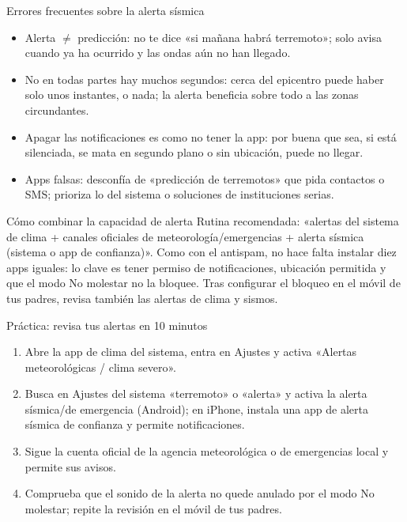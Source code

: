\begin{tcbwarn}{Errores frecuentes sobre la alerta sísmica}
\begin{itemize}
  \item Alerta $\neq$ predicción: no te dice «si mañana habrá terremoto»; solo avisa cuando ya ha ocurrido y las ondas aún no han llegado.
  \item No en todas partes hay muchos segundos: cerca del epicentro puede haber solo unos instantes, o nada; la alerta beneficia sobre todo a las zonas circundantes.
  \item Apagar las notificaciones es como no tener la app: por buena que sea, si está silenciada, se mata en segundo plano o sin ubicación, puede no llegar.
  \item Apps falsas: desconfía de «predicción de terremotos» que pida contactos o SMS; prioriza lo del sistema o soluciones de instituciones serias.
\end{itemize}

\end{tcbwarn}

\begin{tcbinfo}{Cómo combinar la capacidad de alerta}
Rutina recomendada: «alertas del sistema de clima + canales oficiales de meteorología/emergencias + alerta sísmica (sistema o app de confianza)». Como con el antispam, no hace falta instalar diez apps iguales: lo clave es tener permiso de notificaciones, ubicación permitida y que el modo No molestar no la bloquee. Tras configurar el bloqueo en el móvil de tus padres, revisa también las alertas de clima y sismos.

\end{tcbinfo}

\begin{tcbpractice}{Práctica: revisa tus alertas en 10 minutos}
\begin{enumerate}
  \item Abre la app de clima del sistema, entra en Ajustes y activa «Alertas meteorológicas / clima severo».
  \item Busca en Ajustes del sistema «terremoto» o «alerta» y activa la alerta sísmica/de emergencia (Android); en iPhone, instala una app de alerta sísmica de confianza y permite notificaciones.
  \item Sigue la cuenta oficial de la agencia meteorológica o de emergencias local y permite sus avisos.
  \item Comprueba que el sonido de la alerta no quede anulado por el modo No molestar; repite la revisión en el móvil de tus padres.
\end{enumerate}

\end{tcbpractice}

